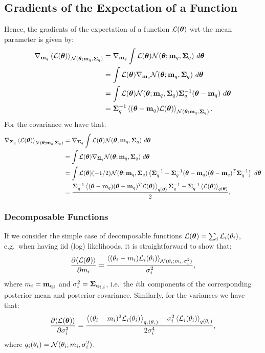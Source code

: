 \subsection{Gradients of the Expectation of a Function \label{sec:gradGaussExp}}
Hence, the gradients of the expectation of a function $\calL(\vectheta)$ wrt the mean parameter is given by:
\begin{align}
	\gradient_{\mq} \Eb{\calL(\vectheta)}_{\Normal(\vectheta; \mq, \Sigmaq)} 
	& = \gradient_{\mq} \int \calL(\vectheta) \Normal(\vectheta; \mq, \Sigmaq) \ d \vectheta \\
	& =  \int \calL(\vectheta) \gradient_{\mq} \Normal(\vectheta; \mq, \Sigmaq) \ d \vectheta \\
	 & =  \int \calL(\vectheta) \Normal(\vectheta; \mq, \Sigmaq)  \Sigmaq^{-1} (\vectheta - \mq) \ d \vectheta \\
	 & = \Sigmaq^{-1} \Eb{ (\vectheta - \mq) \calL(\vectheta) }_{\Normal(\vectheta; \mq, \Sigmaq)} \text{.}
\end{align}
%
For the covariance we have that:
\begin{align}
\gradient_{\Sigmaq} \Eb{\calL(\vectheta)}_{\Normal(\vectheta; \mq, \Sigmaq)} 
&= \gradient_{\Sigmaq} \int \calL(\vectheta) \Normal(\vectheta; \mq, \Sigmaq) \ d \vectheta \\
& = \int  \calL(\vectheta)  \gradient_{\Sigmaq} \Normal(\vectheta; \mq, \Sigmaq) \ d \vectheta \\
& = \int  \calL(\vectheta) (- 1/2) \Normal(\vectheta; \mq, \Sigmaq) \left( \Sigmaq^{-1}  - \Sigmaq^{-1} (\vectheta - \mq) (\vectheta-\mq)^{T} \Sigmaq^{-1}\right) \ d \vectheta \\
&= \frac{       \Sigmaq^{-1} \Eb{(\vectheta - \mq) (\vectheta-\mq)^{T} \calL(\vectheta)}_{q(\vectheta)}  \Sigmaq^{-1}    -  \Sigmaq^{-1}  \Eb{ \calL(\vectheta)}_{q(\vectheta)}  }{2} \text{.}
\end{align}
%
\subsubsection{Decomposable Functions \label{sec:app-decomp}}
If we consider the simple case of decomposable functions $\calL(\vectheta) = \sum_{i} \calL_{i} (\theta_{i})$, e.g.~when having iid (log) likelihoods, it is straightforward to show that:
\begin{align}
	\deriv{ \Eb{\calL(\vectheta)}}{m_{i}} = \frac{ \Eb{(\theta_{i} - m_{i}) \calL_{i}(\theta_{i})}_{\Normal(\theta_{i}; m_{i}, \sigma_{i}^{2})}}{\sigma_{i}^{2}} \text{,}
\end{align}
where $m_{i} = \vecentry{\mq}{i}$ and $\sigma_{i}^{2} = \matentry{\Sigmaq}{i}{i}$, i.e.~the $i\mth$ components of the corresponding posterior mean and posterior covariance.
%
Similarly, for the variances we have that:
\begin{align}
	\deriv{\Eb{\calL(\vectheta)}}{\sigma_{i}^{2}} = 
	\frac{   \Eb{(\theta_{i}-m_{i})^{2} \calL_{i}(\theta_{i}) }_{q_{i}(\theta_{i})}  - \sigma_{i}^{2} \Eb{\calL_{i}(\theta_{i})}_{q(\theta_{i})}   }    {2 \sigma_{i}^{4}} \text{,}
\end{align}
where $q_{i}(\theta_{i}) = \Normal(\theta_{i}; m_{i}, \sigma_{i}^{2})$.

